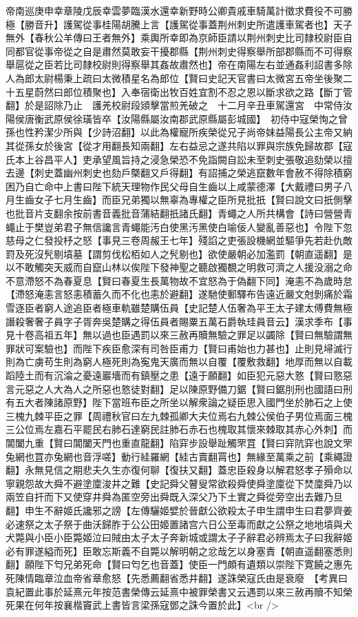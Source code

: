 帝南巡庚申幸章陵戊辰幸雲夢臨漢水還幸新野時公卿貴戚車騎萬計徵求費役不可勝極【勝音升】護駕從事桂陽胡騰上言【護駕從事蓋荆州刺史所遣護車駕者也】天子無外【春秋公羊傳曰王者無外】乘輿所幸即為京師臣請以荆州刺史比司隸校尉臣自同都官從事帝從之自是肅然莫敢妄干擾郡縣【荆州刺史得察舉所部郡縣而不可得察舉扈從之臣若比司隸校尉則得察舉其姦故肅然也】帝在南陽左右並通姦利詔書多除人為郎太尉楊秉上疏曰太微積星名為郎位【賢曰史記天官書曰太微宮五帝坐後聚二十五星蔚然曰郎位積聚也】入奉宿衛出牧百姓宜割不忍之恩以斷求欲之路【斷丁管翻】於是詔除乃止　護羌校尉段熲擊當煎羌破之　十二月辛丑車駕還宮　中常侍汝陽侯唐衡武原侯徐璜皆卒【汝陽縣屬汝南郡武原縣屬彭城國】　初侍中寇榮恂之曾孫也性矜潔少所與【少詩沼翻】以此為權寵所疾榮從兄子尚帝妺益陽長公主帝又納其從孫女於後宮【從才用翻長知兩翻】左右益忌之遂共陷以罪與宗族免歸故郡【寇氏本上谷昌平人】吏承望風旨持之浸急榮恐不免詣闕自訟未至刺史張敬追劾榮以擅去邊【刺史蓋幽州刺史也劾戶槩翻又戶得翻】有詔捕之榮逃竄數年會赦不得除積窮困乃自亡命中上書曰陛下統天理物作民父母自生齒以上咸蒙德澤【大戴禮曰男子八月生齒女子七月生齒】而臣兄弟獨以無辜為專權之臣所見批扺【賢曰說文曰扺側擊也批音片支翻余按前書音義批音蒲結翻扺諸氏翻】青蠅之人所共構會【詩曰營營青蠅止于樊豈弟君子無信讒言青蠅能汚白使黑汚黑使白喻佞人變亂善惡也】令陛下忽慈母之仁發投杼之怒【事見三卷周赧王七年】殘諂之吏張設機網並驅爭先若赴仇敵罸及死沒髠剔墳墓【謂剪伐松栢如人之髠剔也】欲使嚴朝必加濫罰【朝直遥翻】是以不敢觸突天威而自竄山林以俟陛下發神聖之聽啟獨覩之明救可濟之人援没溺之命不意滯怒不為春夏息【賢曰春夏生長萬物故不宜怒為于偽翻下同】淹恚不為歲時怠【滯怒淹恚言怒恚積蓄久而不化也恚於避翻】遂馳使郵驛布告遠近嚴文尅剝痛於霜雪逐臣者窮人途追臣者極車軌雖楚購伍員【史記楚人伍奢為平王太子建太傅費無極譖殺奢奢子員字子胥奔吳楚購之得伍員者賜粟五萬石爵執珪員音云】漢求季布【事見十卷高祖五年】無以過也臣遇罰以來三赦再贖無驗之罪足以蠲除【賢曰無驗謂無罪狀可案驗也】而陛下疾臣愈深有司咎臣甫力【賢曰甫始也力甚也】止則見埽滅行則為亡虜苟生則為窮人極死則為寃鬼天廣而無以自覆【覆敷救翻】地厚而無以自載蹈陸土而有沉淪之憂遠巖墻而有鎮壓之患【遠于願翻】如臣犯元惡大憝【賢曰憝惡言元惡之人大為人之所惡也憝徒對翻】足以陳原野備刀鋸【賢曰鋸刖刑也國語曰刑有五大者陳諸原野】陛下當班布臣之所坐以解衆論之疑臣思入國門坐於肺石之上使三槐九棘平臣之罪【周禮秋官曰左九棘孤卿大夫位焉右九棘公侯伯子男位焉面三槐三公位焉左嘉石平罷民右肺石達窮民註肺石赤石也槐取其懷來棘取其赤心外刺】而閶闔九重【賢曰閶闔天門也重直龍翻】陷穽步設舉趾觸罘罝【賢曰穽阬穽也說文罘兔網也罝亦兔網也音浮嗟】動行絓羅網【絓古賣翻罥也】無緣至萬乘之前【乘繩證翻】永無見信之期悲夫久生亦復何聊【復扶又翻】蓋忠臣殺身以解君怒孝子殞命以寧親怨故大舜不避塗廩浚井之難【史記舜父瞽叟常欲殺舜使舜塗廩從下焚廩舜乃以兩笠自扞而下又使穿井舜為匿空旁出舜既入深父乃下土實之舜從旁空出去難乃旦翻】申生不辭姬氏讒邪之謗【左傳驪姬嬖於晉獻公欲殺太子申生謂申生曰君夢齊姜必速祭之太子祭于曲沃歸胙于公公田姬置諸宫六日公至毒而獻之公祭之地地墳與犬犬斃與小臣小臣斃姬泣曰賊由太子太子奔新城或謂太子子辭君必辨焉太子曰我辭姬必有罪遂縊而死】臣敢忘斯義不自斃以解明朝之忿哉乞以身塞責【朝直遥翻塞悉則翻】願陛下匄兄弟死命【賢曰匄乞也音蓋】使臣一門頗有遺類以崇陛下寛饒之惠先死陳情臨章泣血帝省章愈怒【先悉薦翻省悉井翻】遂誅榮寇氏由是衰廢　【考異曰袁紀置此事於延熹元年按范書榮傳云延熹中被罪榮書又云遇罰以來三赦再贖不知榮死果在何年按襄楷竇武上書皆言梁孫寇鄧之誅今置於此】<br />
